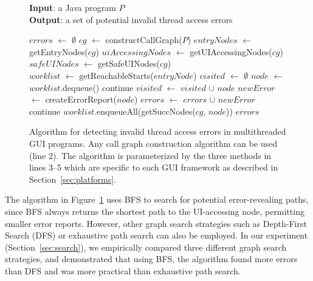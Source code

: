 \begin{figure}[t]
\textbf{Input}: a Java program $\mathit{P}$\\
\textbf{Output}: a set of potential invalid thread access errors\\
\vspace{-4mm}
\begin{algorithmic}[1]
\STATE $\mathit{errors}$ $\leftarrow$ $\emptyset$ 
\STATE $\mathit{cg}$ $\leftarrow$ constructCallGraph($\mathit{P}$)
\STATE $\mathit{entryNodes}$ $\leftarrow$ getEntryNodes($\mathit{cg}$)
\STATE $\mathit{uiAccessingNodes}$ $\leftarrow$ getUIAccessingNodes($\mathit{cg}$)
\STATE $\mathit{safeUINodes}$ $\leftarrow$ getSafeUINodes($\mathit{cg}$)\\
\STATE $\mathit{worklist}$ $\leftarrow$ getReachableStarts($\mathit{entryNode}$)
\STATE $\mathit{visited}$ $\leftarrow$ $\emptyset$
\STATE $\mathit{node}$ $\leftarrow$ $\mathit{worklist}$.dequeue()
\STATE continue
\ENDIF
\STATE $\mathit{visited}$ $\leftarrow$ $\mathit{visited}$ $\cup$ $\mathit{node}$
\STATE $\mathit{newError}$ $\leftarrow$ createErrorReport($\mathit{node}$)
\STATE $\mathit{errors}$ $\leftarrow$ $\mathit{errors}$ $\cup$ $\mathit{newError}$
\STATE continue
\ELSE
\STATE $\mathit{worklist}$.enqueueAll(getSuccNodes($\mathit{cg}$, $\mathit{node}$))
\ENDIF 
\ENDWHILE
\ENDFOR
\RETURN $errors$
\vspace{-2mm}
\end{algorithmic}
\caption{Algorithm for detecting invalid thread access errors in multithreaded GUI programs. 
Any call graph construction algorithm can be used (line 2). The algorithm
is parameterized by the three methods in lines 3--5 which are specific to each GUI framework
 as described in Section~\ref{sec:platforms}.
} \label{fig:detectalgorithm}
\end{figure}

The algorithm in Figure~\ref{fig:detectalgorithm} uses BFS to search
for potential error-revealing paths, since BFS always returns the
shortest path to the UI-accessing node, permitting
smaller error reports. However,
other graph search strategies such as Depth-First Search (DFS) or
exhaustive path search can also be employed. In our experiment (Section~\ref{sec:search}),
we empirically compared three different graph search strategies, and demonstrated that
using BFS, the algorithm found more errors than DFS and was more practical than
exhaustive path search.

